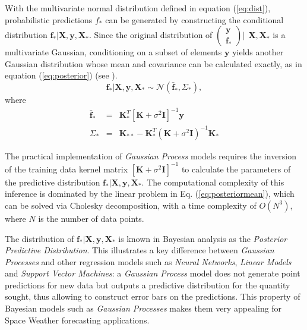 \documentclass[draft,sw]{AGUTeX}
\begin{document}
\begin{article}
With the multivariate normal distribution defined in equation (\ref{eq:dist}), probabilistic predictions $f_*$ can be generated by constructing the conditional distribution $\mathbf{f_*}|\mathbf{X},\mathbf{y},\mathbf{X_*}$. Since the original distribution of $\left( \begin{array}{c} \mathbf{y} \\ \mathbf{f_*} \end{array} \right) | \ \ \mathbf{X}, \mathbf{X}_*$ is a multivariate Gaussian, conditioning on a subset of elements $\mathbf{y}$ yields another Gaussian distribution whose mean and covariance can be calculated exactly, as in equation (\ref{eq:posterior}) (see \citet{Rasmussen:2005:GPM:1162254}).
\begin{equation}
    \mathbf{f_*}|\mathbf{X},\mathbf{y},\mathbf{X_*} \sim \mathcal{N}(\mathbf{\bar{f}_*}, \Sigma_*)  \label{eq:posterior},
\end{equation}
where
\begin{align}
    \mathbf{\bar{f}_*} & = & \mathbf{K}^T_{*} [\mathbf{K} + \sigma^{2} \mathbf{I}]^{-1} \mathbf{y} \label{eq:posteriormean} \\
    \Sigma_* & = & \mathbf{K}_{**} - \mathbf{K}^T_{*} \left(\mathbf{K} + \sigma^{2} \mathbf{I}\right)^{-1} \mathbf{K}_{*} \label{eq:posteriorcov}
\end{align}

The practical implementation of \emph{Gaussian Process} models requires the inversion of the training data kernel matrix $[\mathbf{K} + \sigma^{2} \mathbf{I}]^{-1}$ to calculate the parameters of the predictive distribution $\mathbf{f_*}|\mathbf{X},\mathbf{y},\mathbf{X_*}$. The computational complexity of this inference is dominated by the linear problem in Eq. (\ref{eq:posteriormean}), which can be solved via Cholesky decomposition, with a time complexity of $O(N^3)$, where $N$ is the number of data points.

The distribution of $\mathbf{f_*}| \mathbf{X},\mathbf{y},\mathbf{X_*}$ is known in Bayesian analysis as the \emph{Posterior Predictive Distribution}. This illustrates a key difference between \emph{Gaussian Processes} and other regression models such as \emph{Neural Networks}, \emph{Linear Models} and \emph{Support Vector Machines}: a \emph{Gaussian Process} model does not generate point predictions for new data but outputs a predictive distribution for the quantity sought, thus allowing to construct error bars on the predictions. This property of Bayesian models such as \emph{Gaussian Processes} makes them very appealing for Space Weather forecasting applications. 


\end{article}
\end{document}
